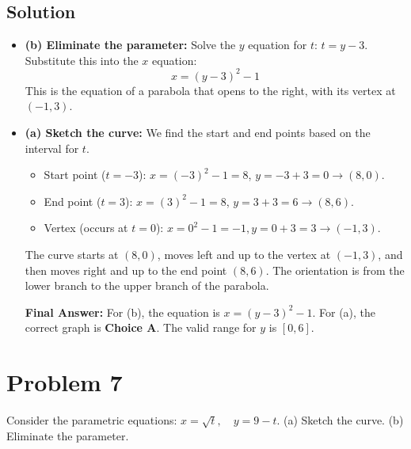 \documentclass{article}
\begin{document}
\subsection*{Solution}
\begin{itemize}
    \item \textbf{(b) Eliminate the parameter:}
    Solve the $y$ equation for $t$: $t = y - 3$.
    Substitute this into the $x$ equation:
    \[ x = (y - 3)^2 - 1 \]
    This is the equation of a parabola that opens to the right, with its vertex at $(-1, 3)$.

    \item \textbf{(a) Sketch the curve:}
    We find the start and end points based on the interval for $t$.
    \begin{itemize}
        \item Start point ($t=-3$): $x = (-3)^2 - 1 = 8$, $y = -3 + 3 = 0 \rightarrow (8, 0)$.
        \item End point ($t=3$): $x = (3)^2 - 1 = 8$, $y = 3 + 3 = 6 \rightarrow (8, 6)$.
        \item Vertex (occurs at $t=0$): $x=0^2-1 = -1, y=0+3=3 \rightarrow (-1, 3)$.
    \end{itemize}
    The curve starts at $(8, 0)$, moves left and up to the vertex at $(-1, 3)$, and then moves right and up to the end point $(8, 6)$. The orientation is from the lower branch to the upper branch of the parabola.

    \textbf{Final Answer:} For (b), the equation is $x = (y-3)^2-1$. For (a), the correct graph is \textbf{Choice A}. The valid range for $y$ is $[0, 6]$.
\end{itemize}

\section{Problem 7}
Consider the parametric equations: $x = \sqrt{t}, \quad y = 9 - t$.
(a) Sketch the curve.
(b) Eliminate the parameter.
\end{document}
